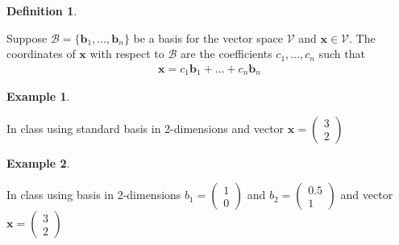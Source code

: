 \documentclass[
]{book}
\theoremstyle{definition}
\newtheorem{definition}{Definition}[chapter]
\theoremstyle{definition}
\newtheorem{example}{Example}[chapter]
\theoremstyle{definition}
\theoremstyle{remark}
\begin{document}
\begin{definition}
\protect\hypertarget{def:unlabeled-div-136}{}\label{def:unlabeled-div-136}

Suppose \(\mathcal{B} = \{ \mathbf{b}_1, \ldots, \mathbf{b}_n \}\) be a basis for the vector space \(\mathcal{V}\) and \(\mathbf{x} \in \mathcal{V}\). The coordinates of \(\mathbf{x}\) with respect to \(\mathcal{B}\) are the coefficients \(c_1, \ldots, c_n\) such that
\[
\begin{aligned}
\mathbf{x} = c_1 \mathbf{b}_1 + \ldots + c_n \mathbf{b}_n
\end{aligned}
\]

\end{definition}

\begin{example}
\protect\hypertarget{exm:unlabeled-div-137}{}\label{exm:unlabeled-div-137}

In class using standard basis in 2-dimensions and vector \(\mathbf{x} = \begin{pmatrix} 3 \\ 2 \end{pmatrix}\)

\end{example}

\begin{example}
\protect\hypertarget{exm:unlabeled-div-138}{}\label{exm:unlabeled-div-138}

In class using basis in 2-dimensions \(b_1 = \begin{pmatrix} 1 \\ 0 \end{pmatrix}\) and \(b_2 = \begin{pmatrix} 0.5 \\ 1 \end{pmatrix}\) and vector \(\mathbf{x} = \begin{pmatrix} 3 \\ 2 \end{pmatrix}\)

\end{example}
\end{document}
